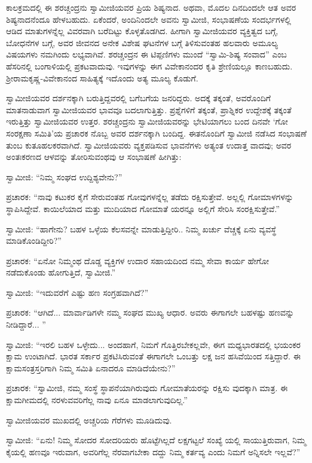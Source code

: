 ಕಾಲಕ್ರಮದಲ್ಲಿ ಈ ಶರಚ್ಚಂದ್ರನು ಸ್ವಾಮೀಜಿಯವರ ಪ್ರಿಯ ಶಿಷ್ಯನಾದ. ಅಥವಾ, ಮೊದಲ ದಿನದಿಂದಲೇ ಆತ ಅವರ ಶಿಷ್ಯನಾದನೆಂದೂ ಹೇಳಬಹುದು. ಏಕೆಂದರೆ, ಅಂದಿನಿಂದಲೇ ಅವನು ಸ್ವಾಮೀಜಿ, ಸಂಭಾಷಣೆಯ ಸಂದರ್ಭಗಳಲ್ಲಿ ಆಡಿದ ಮಾತುಗಳನ್ನೆಲ್ಲ ವಿವರವಾಗಿ ಬರೆದಿಟ್ಟು ಕೊಳ್ಳತೊಡಗಿದ. ಹೀಗಾಗಿ ಸ್ವಾಮೀಜಿಯವರ ವ್ಯಕ್ತಿತ್ವದ ಬಗ್ಗೆ, ಬೋಧನೆಗಳ ಬಗ್ಗೆ, ಅವರ ಜೀವನದ ಅನೇಕ ವಿಶೇಷ ಘಟನೆಗಳ ಬಗ್ಗೆ ತಿಳಿಸುವಂತಹ ಹಲವಾರು ಅಮೂಲ್ಯ ವಿಷಯಗಳು ನಮಗಿಂದು ಲಭ್ಯವಾಗಿವೆ. ಶರಚ್ಚಂದ್ರನ ಈ ಟಿಪ್ಪಣಿಗಳು ಮುಂದೆ “ಸ್ವಾಮಿ-ಶಿಷ್ಯ ಸಂವಾದ” ಎಂಬ ಹೆಸರಿನಲ್ಲಿ ಬಂಗಾಳಿಯಲ್ಲಿ ಪ್ರಕಟವಾದುವು. ಇವುಗಳನ್ನು ಈಗ ವಿವೇಕಾನಂದರ ಕೃತಿ ಶ್ರೇಣಿಯಲ್ಲೂ ಕಾಣಬಹುದು. ಶ್ರೀರಾಮಕೃಷ್ಣ-ವಿವೇಕಾನಂದ ಸಾಹಿತ್ಯಕ್ಕೆ ಇದೊಂದು ಅತ್ಯ ಮೂಲ್ಯ ಕೊಡುಗೆ.

ಸ್ವಾಮೀಜಿಯವರ ದರ್ಶನಕ್ಕಾಗಿ ಬರುತ್ತಿದ್ದವರಲ್ಲಿ ಬಗೆಬಗೆಯ ಜನರಿದ್ದರು. ಅದಕ್ಕೆ ತಕ್ಕಂತೆ, ಅವರೊಂದಿಗೆ ಮಾತನಾಡುವಾಗ ಸ್ವಾಮೀಜಿಯವರ ಭಾವವೂ ಬದಲಾಗುತ್ತಿತ್ತು. ಪ್ರಶ್ನೆಗಳಿಗೆ ತಕ್ಕಂತೆ, ಪ್ರಾಶ್ನಿಕರ ಉದ್ದೇಶಕ್ಕೆ ತಕ್ಕಂತೆ ಇರುತ್ತಿತ್ತು ಸ್ವಾಮೀಜಿಯವರ ಉತ್ತರ. ಶರಚ್ಚಂದ್ರನು ಸ್ವಾಮೀಜಿಯವರನ್ನು ಭೇಟಿಯಾಗಲು ಬಂದ ದಿನವೇ ‘ಗೋ ಸಂರಕ್ಷಣಾ ಸಮಿತಿ’ಯ ಪ್ರಚಾರಕ ನೊಬ್ಬ ಅವರ ದರ್ಶನಕ್ಕಾಗಿ ಬಂದಿದ್ದ. ಈತನೊಂದಿಗೆ ಸ್ವಾಮೀಜಿ ನಡೆಸಿದ ಸಂಭಾಷಣೆ ತುಂಬ ಕುತೂಹಲಕರವಾಗಿದೆ. ಸ್ವಾಮೀಜಿಯವರು ವ್ಯಕ್ತಪಡಿಸುವ ಭಾವನೆಗಳು ಅತ್ಯಂತ ಉದಾತ್ತ ವಾದವು; ಅವರ ಅಂತಃಕರಣದ ಆಳವನ್ನು ತೋರಿಸುವಂಥವು ಆ ಸಂಭಾಷಣೆ ಹೀಗಿತ್ತು:

ಸ್ವಾಮೀಜಿ: “ನಿಮ್ಮ ಸಂಘದ ಉದ್ದಿಶ್ಯವೇನು?”

ಪ್ರಚಾರಕ: “ನಾವು ಕಟುಕರ ಕೈಗೆ ಸೇರುವಂತಹ ಗೋವುಗಳನ್ನೆಲ್ಲ ತಡೆದು ರಕ್ಷಿಸುತ್ತೇವೆ. ಅಲ್ಲಲ್ಲಿ ಗೋಮಾಳಗಳನ್ನು ಸ್ಥಾಪಿಸಿದ್ದೇವೆ. ಕಾಯಿಲೆಯಾದ ಮತ್ತು ಮುದಿಯಾದ ಗೋಮಾತೆ ಯರನ್ನೂ ಅಲ್ಲಿಗೆ ಸೇರಿಸಿ ಸಂರಕ್ಷಿಸುತ್ತೇವೆ.”

ಸ್ವಾಮೀಜಿ: “ಹಾಗೇನು? ಬಹಳ ಒಳ್ಳೆಯ ಕೆಲಸವನ್ನೇ ಮಾಡುತ್ತಿದ್ದೀರಿ.. ನಿಮ್ಮ ಖರ್ಚು ವೆಚ್ಚಕ್ಕೆ ಏನು ವ್ಯವಸ್ಥೆ ಮಾಡಿಕೊಂಡಿದ್ದೀರಿ?”

ಪ್ರಚಾರಕ: “ಏನೋ ನಿಮ್ಮಂಥ ದೊಡ್ಡ ವ್ಯಕ್ತಿಗಳ ಉದಾರ ಸಹಾಯದಿಂದ ನಮ್ಮ ಸೇವಾ ಕಾರ್ಯ ಹೇಗೋ ನಡೆದುಕೊಂಡು ಹೋಗುತ್ತಿದೆ, ಸ್ವಾಮೀಜಿ.”

ಸ್ವಾಮೀಜಿ: “ಇದುವರೆಗೆ ಎಷ್ಟು ಹಣ ಸಂಗ್ರಹವಾಗಿದೆ?”

ಪ್ರಚಾರಕ: “ಆಗಿದೆ... ಮಾರ್ವಾಡಿಗಳೇ ನಮ್ಮ ಸಂಘದ ಮುಖ್ಯ ಆಧಾರ. ಅವರು ಈಗಾಗಲೇ ಬಹಳಷ್ಟು ಹಣವನ್ನು ನೀಡಿದ್ದಾರೆ... ”

ಸ್ವಾಮೀಜಿ: “ಇರಲಿ ಬಹಳ ಒಳ್ಳೇದು... ಅಂದಹಾಗೆ, ನಿಮಗೆ ಗೊತ್ತಿರಬೇಕಲ್ಲವೇ, ಈಗ ಮಧ್ಯಭಾರತದಲ್ಲಿ ಭಯಂಕರ ಕ್ಷಾಮ ಉಂಟಾಗಿದೆ. ಭಾರತ ಸರ್ಕಾರ ಪ್ರಕಟಿಸಿರುವಂತೆ ಈಗಾಗಲೇ ಒಂಬತ್ತು ಲಕ್ಷ ಜನ ಹಸಿವೆಯಿಂದ ಸತ್ತಿದ್ದಾರೆ. ಈ ಕ್ಷಾಮಸಂತ್ರಸ್ತರಿಗಾಗಿ ನಿಮ್ಮ ಸಮಿತಿ ಏನಾದರೂ ಮಾಡಿದೆಯೇನು?”

ಪ್ರಚಾರಕ: “ಸ್ವಾಮೀಜಿ, ನಮ್ಮ ಸಂಸ್ಥೆ ಸ್ಥಾಪನೆಯಾಗಿರುವುದು ಗೋಮಾತೆಯರನ್ನು ರಕ್ಷಿಸು ವುದಕ್ಕಾಗಿ ಮಾತ್ರ. ಈ ಕ್ಷಾಮಗೀಮದಲ್ಲಿ ನರಳುವವರಿಗೆಲ್ಲ ನಾವು ಏನೂ ಮಾಡಲಾಗುವುದಿಲ್ಲ.”

ಸ್ವಾಮೀಜಿಯವರ ಮುಖದಲ್ಲಿ ಅಚ್ಚರಿಯ ಗೆರೆಗಳು ಮೂಡಿದುವು.

ಸ್ವಾಮೀಜಿ: “ಏನು! ನಿಮ್ಮ ಸೋದರ ಸೋದರಿಯರು ಹೊಟ್ಟೆಗಿಲ್ಲದೆ ಲಕ್ಷಗಟ್ಟಲೆ ಸಂಖ್ಯೆ ಯಲ್ಲಿ ಸಾಯುತ್ತಿರುವಾಗ, ನಿಮ್ಮ ಕೈಯಲ್ಲಿ ಹಣವೂ ಇರುವಾಗ, ಅವರಿಗೆಲ್ಲ ನೆರವಾಗಬೇಕಾ ದದ್ದು ನಿಮ್ಮ ಕರ್ತವ್ಯ ಎಂದು ನಿಮಗೆ ಅನ್ನಿಸಲೇ ಇಲ್ಲವೆ?”

